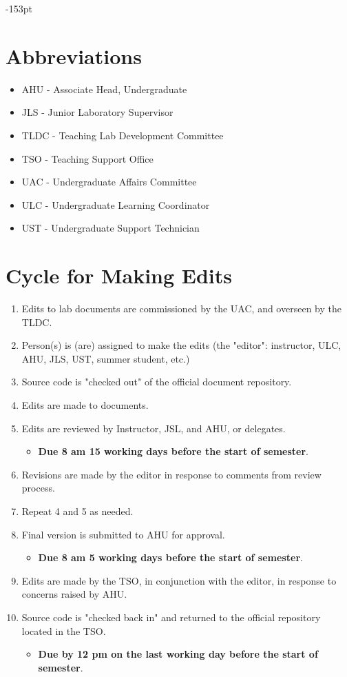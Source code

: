 \begin{adjustwidth}{}{-153pt}
\newpage

\section{\bf Abbreviations} 
\begin{itemize}[noitemsep]
\item AHU - Associate Head, Undergraduate%
\item JLS - Junior Laboratory Supervisor
\item TLDC -	Teaching Lab Development Committee
\item TSO - Teaching Support Office
\item UAC - Undergraduate Affairs Committee
\item ULC - Undergraduate Learning Coordinator
\item UST - Undergraduate Support Technician
\end{itemize}

\section{\bf Cycle for Making Edits}
\begin{enumerate}[noitemsep]
\item Edits to lab documents are commissioned by the UAC, and overseen by the TLDC.
\item Person(s) is (are) assigned to make the edits (the "editor": instructor, ULC, AHU, JLS, UST, summer student, etc.)
\item Source code is "checked out" of the official document repository.
\item Edits are made to documents.
\item Edits are reviewed by Instructor, JSL, and AHU, or delegates. 
\begin{itemize}
\item {\bf Due 8 am 15 working days before the start of semester}.
\end{itemize}
\item Revisions are made by the editor in response to comments from review process.
\item Repeat 4 and 5 as needed.
\item Final version is submitted to AHU for approval.
\begin{itemize}
\item {\bf Due 8 am 5 working days before the start of semester}.
\end{itemize}
\item Edits are made by the TSO, in conjunction with the editor, in response to concerns raised by AHU.
\item Source code is "checked back in" and returned to the official repository located in the TSO.
\begin{itemize}
\item {\bf Due by 12 pm on the last working day before the start of semester}.
\end{itemize}
\end{enumerate}


\end{adjustwidth}
